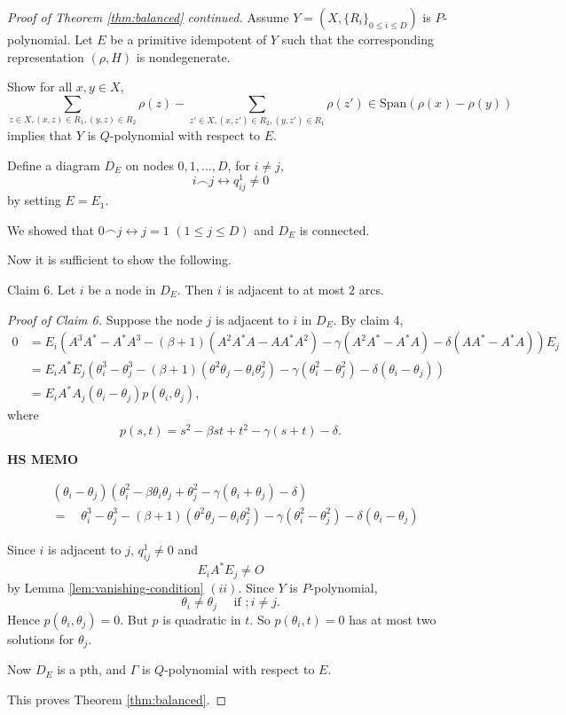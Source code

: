 \documentclass[
]{book}
\theoremstyle{definition}
\theoremstyle{definition}
\theoremstyle{definition}
\theoremstyle{definition}
\theoremstyle{remark}
\begin{document}
\begin{proof}[Proof of Theorem \ref{thm:balanced} continued]
Assume \(Y = (X, \{R_i\}_{0\leq i\leq D})\) is \(P\)-polynomial.
Let \(E\) be a primitive idempotent of \(Y\) such that the corresponding representation \((\rho, H)\) is nondegenerate.

Show for all \(x, y\in X\),
\[\sum_{z\in X, (x,z)\in R_1, (y,z)\in R_2}\rho(z) - \sum_{z'\in X, (x,z')\in R_2, (y,z')\in R_1}\rho(z') \in \mathrm{Span}(\rho(x)-\rho(y))\]
implies that \(Y\) is \(Q\)-polynomial with respect to \(E\).

Define a diagram \(D_E\) on nodes \(0, 1, \ldots, D\), for \(i\neq j\),
\[i \frown j \leftrightarrow q^1_{ij}\neq 0\]
by setting \(E = E_1\).

We showed that \(0 \frown j \leftrightarrow j = 1\) \((1\leq j\leq D)\) and \(D_E\) is connected.

Now it is sufficient to show the following.

Claim 6. Let \(i\) be a node in \(D_E\). Then \(i\) is adjacent to at most \(2\) arcs.

\emph{Proof of Claim 6.}
Suppose the node \(j\) is adjacent to \(i\) in \(D_E\). By claim 4,
\begin{align}
0 & = E_i(A^3A^* - A^*A^3 - (\beta+1)(A^2A^*A-AA^*A^2) - \gamma(A^2A^*-A^*A) - \delta(AA^*-A^*A))E_j\\
& = E_iA^*E_j(\theta^3_i-\theta^3_j-(\beta+1)(\theta^2\theta_j - \theta_i\theta_j^2)-\gamma(\theta_i^2-\theta_j^2)-\delta(\theta_i-\theta_j))\\
& = E_iA^*A_j(\theta_i-\theta_j)p(\theta_i, \theta_j),
\end{align}
where
\[p(s,t) = s^2 - \beta st + t^2 - \gamma(s+t) - \delta.\]

\textbf{HS MEMO}

\begin{align}
& (\theta_i-\theta_j)(\theta_i^2 - \beta \theta_i\theta_j + \theta_j^2 - \gamma(\theta_i + \theta_j) - \delta)\\
& = \quad \theta^3_i-\theta^3_j-(\beta+1)(\theta^2\theta_j - \theta_i\theta_j^2)-\gamma(\theta_i^2-\theta_j^2)-\delta(\theta_i-\theta_j)
\end{align}

Since \(i\) is adjacent to \(j\), \(q^1_{ij}\neq 0\) and
\[E_iA^*E_j\neq O\]
by Lemma \ref{lem:vanishing-condition} \((ii)\).
Since \(Y\) is \(P\)-polynomial,
\[\theta_i \neq \theta_j \quad \text{ if }; i\neq j.\]
Hence \(p(\theta_i,\theta_j) = 0\). But \(p\) is quadratic in \(t\). So \(p(\theta_i,t) = 0\) has at most two solutions for \(\theta_j\).

Now \(D_E\) is a pth, and \(\Gamma\) is \(Q\)-polynomial with respect to \(E\).

This proves Theorem \ref{thm:balanced}.
\end{proof}
\end{document}
